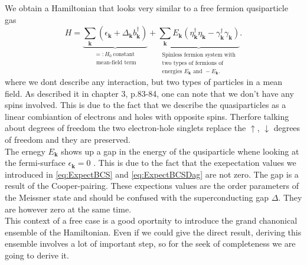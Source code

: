 \documentclass[../main.tex]{subfile}
\begin{document}
We obtain a Hamiltonian that looks very similar to a free fermion qusiparticle gas 
\begin{equation}\label{eq:HamiltonianBCS2}
H = \underbrace{\sum_{\bm{k}} \left(\epsilon_{\bm{k}} + \Delta_{\bm{k}} b_{\bm{k}}^{\dagger}\right)}_{\substack{=:H_0~ \text{constant}\\\text{ mean-field term}}}  + \underbrace{\sum_{\bm{k}} E_{\bm{k}}\left(\eta_{\bm{k}}^{\dagger}\eta_{\bm{k}} - \gamma_{\bm{k}}^{\dagger}\gamma_{\bm{k}}\right)}_{\substack{\text{Spinless fermion system with} \\\text{two types of fermions of}\\\text{energies }E_{\bm{k}}\text{ and }-E_{\bm{k}}.}}.
\end{equation}
where we dont describe any interaction, but two types of particles in a mean field. 
As \cite{FossheimSudbo2004} described it in chapter 3, p.83-84, one can note that we don't have any spins involved. This is due
to the fact that we describe the quasiparticles as a linear combiantion of electrons and holes with opposite spins. 
Therfore talking about degrees of freedom the two electron-hole singlets replace the $\uparrow$, $\downarrow$ degrees of freedom and they are preserved.\\

The ernegy $E_{\bm{k}}$ shows up a gap in the energy of the qusiparticle whene looking at the fermi-surface $\epsilon_{\bm{k}}=0$ .
This is due to the fact that the exepectation values we introduced in \ref{eq:ExpectBCS} and \ref{eq:ExpectBCSDag} are not zero. The gap is a result of the Cooper-pairing. These expections values
are the order parameters of the Meissner state and should be confused with the superconducting gap $\Delta$. They are however zero at the same time. \\

This context of a free case is a good oportnity to introduce the grand chanonical ensemble of the Hamiltonian. 
Even if we could give the direct result, deriving this ensemble involves a lot of important step, so for
the seek of completeness we are going to derive it.\\
\end{document}
